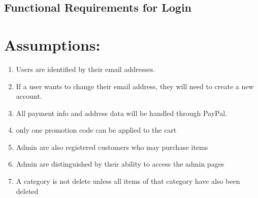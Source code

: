 \documentclass[10pt,letter]{article}
\begin{document}
\subsection{Functional Requirements for Login}


\section{Assumptions:}
\begin{enumerate}
    \item Users are identified by their email addresses.
    \item If a user wants to change their email address, they will need to create a new account.
    \item All payment info and address data will be handled through PayPal.
    \item only one promotion code can be applied to the cart
    \item Admin are also registered customers who may purchase items
    \item Admin are distinguished by their ability to access the admin pages
    \item A category is not delete unless all items of that category have also been deleted
\end{enumerate}
\end{document}

